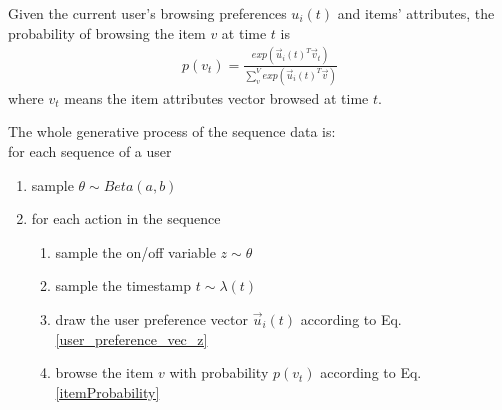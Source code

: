 \documentclass[11pt]{article}
\begin{document}


Given the current user's browsing preferences $u_i(t)$ and items' attributes, the probability of browsing the item $v$ at time $t$ is
\begin{align}\label{itemProbability}
p(v_t) = \frac{exp(\vec{u}_i(t)^T\vec{v}_t)}{\sum^V_v exp(\vec{u}_i(t)^T\vec{v})}
\end{align}
where $v_t$ means the item attributes vector browsed at time $t$. 

The whole generative process of the sequence data is: \\
for each sequence of a user 
\begin{enumerate} \denselist
\item sample $\theta\sim Beta(a, b)$
\item for each action in the sequence
    \begin{enumerate}\denselist
    \item sample the on/off variable $z \sim \theta$
    \item sample the timestamp $t \sim \lambda(t)$
    \item draw the user preference vector $\vec{u}_i(t)$ according to  Eq.\ref{user_preference_vec_z}
    \item browse the item $v$ with probability $p(v_t)$ according to Eq.\ref{itemProbability}
    \end{enumerate}
\end{enumerate}
\end{document}

